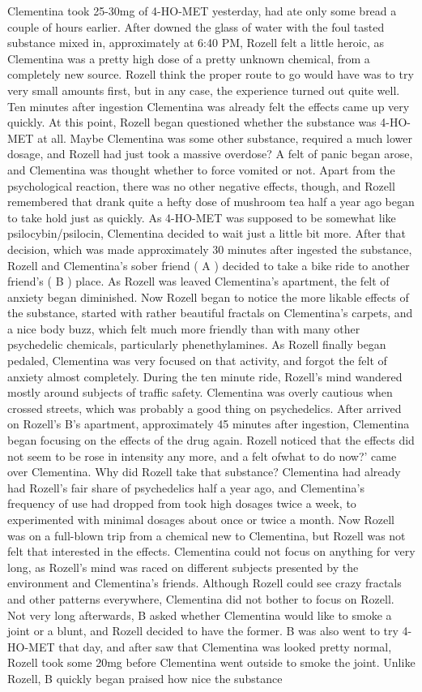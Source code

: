 \documentclass[12pt]{book}
\begin{document}
Clementina took 25-30mg of 4-HO-MET yesterday, had ate only some bread a couple of hours earlier. After downed the glass of water with the foul tasted substance mixed in, approximately at 6:40 PM, Rozell felt a little heroic, as Clementina was a pretty high dose of a pretty unknown chemical, from a completely new source. Rozell think the proper route to go would have was to try very small amounts first, but in any case, the experience turned out quite well. Ten minutes after ingestion Clementina was already felt the effects came up very quickly. At this point, Rozell began questioned whether the substance was 4-HO-MET at all. Maybe Clementina was some other substance, required a much lower dosage, and Rozell had just took a massive overdose? A felt of panic began arose, and Clementina was thought whether to force vomited or not. Apart from the psychological reaction, there was no other negative effects, though, and Rozell remembered that drank quite a hefty dose of mushroom tea half a year ago began to take hold just as quickly. As 4-HO-MET was supposed to be somewhat like psilocybin/psilocin, Clementina decided to wait just a little bit more. After that decision, which was made approximately 30 minutes after ingested the substance, Rozell and Clementina's sober friend ( A ) decided to take a bike ride to another friend's ( B ) place. As Rozell was leaved Clementina's apartment, the felt of anxiety began diminished. Now Rozell began to notice the more likable effects of the substance, started with rather beautiful fractals on Clementina's carpets, and a nice body buzz, which felt much more friendly than with many other psychedelic chemicals, particularly phenethylamines. As Rozell finally began pedaled, Clementina was very focused on that activity, and forgot the felt of anxiety almost completely. During the ten minute ride, Rozell's mind wandered mostly around subjects of traffic safety. Clementina was overly cautious when crossed streets, which was probably a good thing on psychedelics. After arrived on Rozell's B's apartment, approximately 45 minutes after ingestion, Clementina began focusing on the effects of the drug again. Rozell noticed that the effects did not seem to be rose in intensity any more, and a felt ofwhat to do now?' came over Clementina. Why did Rozell take that substance? Clementina had already had Rozell's fair share of psychedelics half a year ago, and Clementina's frequency of use had dropped from took high dosages twice a week, to experimented with minimal dosages about once or twice a month. Now Rozell was on a full-blown trip from a chemical new to Clementina, but Rozell was not felt that interested in the effects. Clementina could not focus on anything for very long, as Rozell's mind was raced on different subjects presented by the environment and Clementina's friends. Although Rozell could see crazy fractals and other patterns everywhere, Clementina did not bother to focus on Rozell. Not very long afterwards, B asked whether Clementina would like to smoke a joint or a blunt, and Rozell decided to have the former. B was also went to try 4-HO-MET that day, and after saw that Clementina was looked pretty normal, Rozell took some 20mg before Clementina went outside to smoke the joint. Unlike Rozell, B quickly began praised how nice the substance 
\end{document}
